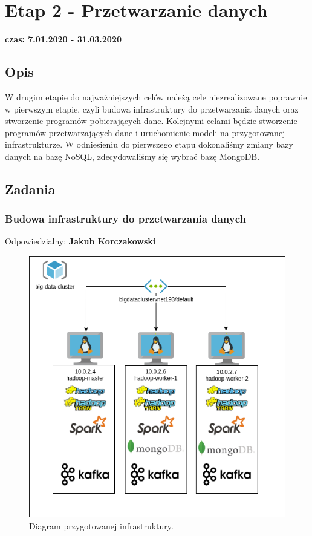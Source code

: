 \documentclass[a4paper,11pt, notitlepage ]{article}
\begin{document}
\section{Etap 2 - Przetwarzanie danych}
\textbf{czas: 7.01.2020 - 31.03.2020}
\subsection{Opis} 
W drugim etapie do najważniejszych celów należą cele niezrealizowane poprawnie w pierwszym etapie, czyli budowa infrastruktury do przetwarzania danych oraz stworzenie programów pobierających dane. Kolejnymi celami będzie stworzenie programów przetwarzających dane i uruchomienie modeli na przygotowanej infrastrukturze. W odniesieniu do pierwszego etapu dokonaliśmy zmiany bazy danych na bazę NoSQL, zdecydowaliśmy się wybrać bazę MongoDB.
\subsection{Zadania}
    \subsubsection{Budowa infrastruktury do przetwarzania danych}
    Odpowiedzialny: \textbf{Jakub Korczakowski}\\
    \begin{figure}[h]
        \centering
        \includegraphics[width=1 \textwidth]{diagram1.png}
        \caption{Diagram przygotowanej infrastruktury.}
        \label{fig:diagram}
    \end{figure}
\end{document}
